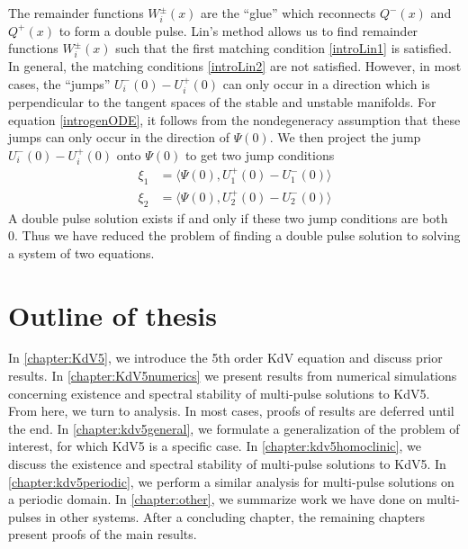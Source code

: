 \documentclass[thesis.tex]{subfiles}
\begin{document}
The remainder functions $W_i^\pm(x)$ are the ``glue'' which reconnects $Q^-(x)$ and $Q^+(x)$ to form a double pulse. Lin's method allows us to find remainder functions $W_i^\pm(x)$ such that the first matching condition \cref{introLin1} is satisfied. In general, the matching conditions \cref{introLin2} are not satisfied. However, in most cases, the ``jumps'' $U_i^-(0) - U_i^+(0)$ can only occur in a direction which is perpendicular to the tangent spaces of the stable and unstable manifolds. For equation \cref{introgenODE}, it follows from the nondegeneracy assumption that these jumps can only occur in the direction of $\Psi(0)$. We then project the jump $U_i^-(0) - U_i^+(0)$ onto $\Psi(0)$ to get two jump conditions
\begin{equation}\label{introLinJump}
\begin{aligned}
\xi_1 &= \langle \Psi(0), U_1^+(0) - U_1^-(0) \rangle \\
\xi_2 &= \langle \Psi(0), U_2^+(0) - U_2^-(0) \rangle
\end{aligned}
\end{equation} 
A double pulse solution exists if and only if these two jump conditions are both 0. Thus we have reduced the problem of finding a double pulse solution to solving a system of two equations.

\section{Outline of thesis}

In \cref{chapter:KdV5}, we introduce the 5th order KdV equation and discuss prior results. In \cref{chapter:KdV5numerics} we present results from numerical simulations concerning existence and spectral stability of multi-pulse solutions to KdV5. From here, we turn to analysis. In most cases, proofs of results are deferred until the end. In \cref{chapter:kdv5general}, we formulate a generalization of the problem of interest, for which KdV5 is a specific case. In \cref{chapter:kdv5homoclinic}, we discuss the existence and spectral stability of multi-pulse solutions to KdV5. In \cref{chapter:kdv5periodic}, we perform a similar analysis for multi-pulse solutions on a periodic domain. In \cref{chapter:other}, we summarize work we have done on multi-pulses in other systems. After a concluding chapter, the remaining chapters present proofs of the main results.

\iffulldocument\else
	
	
\fi
\end{document}
